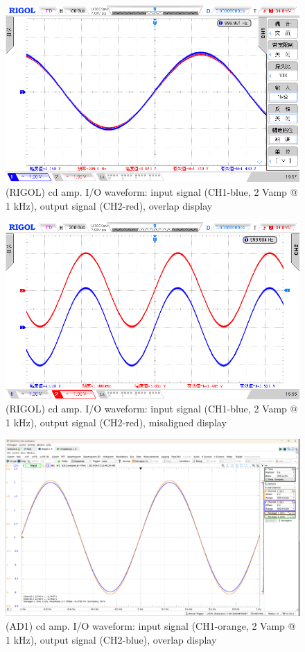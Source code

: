 \documentclass[UTF8]{article}
\begin{document}
\begin{figure}[H]\centering
    \includegraphics[width=\columnwidth]{LCE-04-场效应管/assets/cd amp/cd amp 输入输出波形 RIGOL.png}
    \caption{(RIGOL) cd amp. I/O waveform: input signal (CH1-blue, 2 Vamp @ 1 kHz), output signal (CH2-red), overlap display}
\end{figure}
\begin{figure}[H]\centering
    \includegraphics[width=\columnwidth]{LCE-04-场效应管/assets/cd amp/cd amp 输入输出波形 RIGOL (2).png}
    \caption{(RIGOL) cd amp. I/O waveform: input signal (CH1-blue, 2 Vamp @ 1 kHz), output signal (CH2-red), misaligned display}
\end{figure}
\begin{figure}[H]\centering
    \includegraphics[width=\columnwidth]{LCE-04-场效应管/assets/cd amp/cd amp 输入输出波形.png}
    \caption{(AD1) cd amp. I/O waveform: input signal (CH1-orange, 2 Vamp @ 1 kHz), output signal (CH2-blue), overlap display}
\end{figure}
\end{document}
